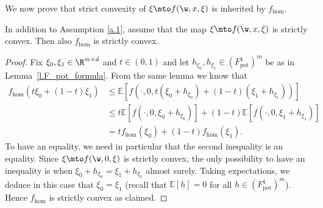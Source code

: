 We now prove that strict convexity of $\xi\mto f(\w,x,\xi)$ is inherited by $f_{\hom}$.
\begin{proposition}\label{p.f_hom_strictly_convex}
In addition to Assumption \ref{a.1}, assume that the map $\xi\mto f(\w,x,\xi)$ is strictly convex. Then also $f_{\hom}$ is strictly convex.
\end{proposition}
\begin{proof}
Fix $\xi_0,\xi_1\in\R^{m\times d}$ and $t\in (0,1)$ and let $h_{\xi_0},h_{\xi_1}\in (F_\mathrm{pot}^1)^m$ be as in Lem\-ma~\ref{l.F_pot_formula}. From the same lemma we know that
\begin{align*}
f_{\hom}(t\xi_0+(1-t)\xi_1)&\leq \mathbb{E}[f(\cdot,0,t(\xi_0+h_{\xi_0})+(1-t)(\xi_1+h_{\xi_1}))]
\\
&\leq t \mathbb{E}[f(\cdot,0,\xi_0+h_{\xi_0})]+(1-t)\mathbb{E}[f(\cdot,0,\xi_1+h_{\xi_1})]
\\
&=tf_{\hom}(\xi_0)+(1-t)f_{\hom}(\xi_1).
\end{align*}
To have an equality, we need in particular that the second inequality is an equality. Since $\xi\mto f(\w,0,\xi)$ is strictly convex, the only possibility to have an inequality is when $\xi_0+h_{\xi_0}=\xi_1+h_{\xi_1}$ almost surely. Taking expectations, we deduce in this case that $\xi_0=\xi_1$ (recall that $\mathbb{E}[h]=0$ for all $h\in (F_\mathrm{pot}^1)^m$). Hence $f_{\hom}$ is strictly convex as claimed.
\end{proof}

